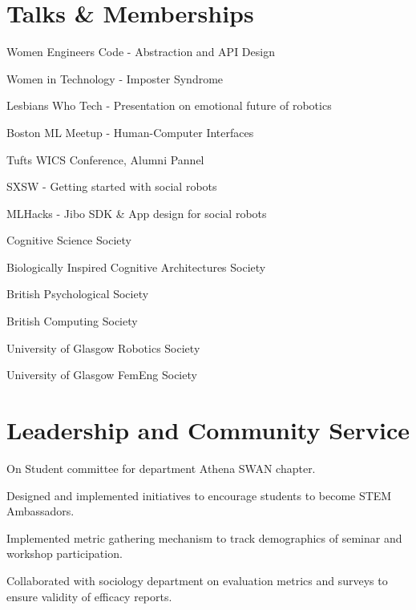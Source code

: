 \documentclass[]{csaund_resume-openfont}
\begin{document}
\section{Talks \& Memberships}
\descript {}
\begin{tightemize}
\item Women Engineers Code - Abstraction and API Design
\item Women in Technology - Imposter Syndrome
\item Lesbians Who Tech - Presentation on emotional future of robotics 
\item Boston ML Meetup - Human-Computer Interfaces
\item Tufts WICS Conference, Alumni Pannel 
\end{tightemize}
\sectionsep

\descript {}
\begin{tightemize}
\item SXSW - Getting started with social robots
\item MLHacks - Jibo SDK \& App design for social robots
\end{tightemize}
\sectionsep

\descript{ }
\begin{tightemize}
\item Cognitive Science Society
\item Biologically Inspired Cognitive Architectures Society
\item British Psychological Society
\item British Computing Society
\item University of Glasgow Robotics Society
\item University of Glasgow FemEng Society
\end{tightemize}
\sectionsep


\section{Leadership and Community Service}

\begin{tightemize}
\item On Student committee for department Athena SWAN chapter.
\item Designed and implemented initiatives to encourage students to become STEM Ambassadors.
\item Implemented metric gathering mechanism to track demographics of seminar and workshop participation.
\item Collaborated with sociology department on evaluation metrics and surveys to ensure validity of efficacy reports.\end{tightemize}
\sectionsep
\end{document}
